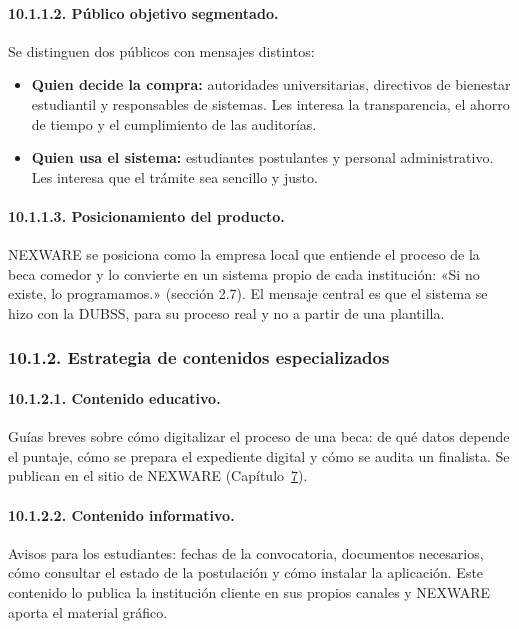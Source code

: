 \paragraph{10.1.1.2. Público objetivo segmentado.}

Se distinguen dos públicos con mensajes distintos:

\begin{itemize}
    \item \textbf{Quien decide la compra:} autoridades universitarias, directivos de bienestar estudiantil y responsables de sistemas. Les interesa la transparencia, el ahorro de tiempo y el cumplimiento de las auditorías.
    \item \textbf{Quien usa el sistema:} estudiantes postulantes y personal administrativo. Les interesa que el trámite sea sencillo y justo.
\end{itemize}

\paragraph{10.1.1.3. Posicionamiento del producto.}

NEXWARE se posiciona como la empresa local que entiende el proceso de la beca comedor y lo convierte en un sistema propio de cada institución: «Si no existe, lo programamos.» (sección 2.7). El mensaje central es que el sistema se hizo con la DUBSS, para su proceso real y no a partir de una plantilla.

\subsubsection{10.1.2. Estrategia de contenidos especializados}

\paragraph{10.1.2.1. Contenido educativo.}

Guías breves sobre cómo digitalizar el proceso de una beca: de qué datos depende el puntaje, cómo se prepara el expediente digital y cómo se audita un finalista. Se publican en el sitio de NEXWARE (Capítulo~\hyperref[cap:sitio_web]{7}).

\paragraph{10.1.2.2. Contenido informativo.}

Avisos para los estudiantes: fechas de la convocatoria, documentos necesarios, cómo consultar el estado de la postulación y cómo instalar la aplicación. Este contenido lo publica la institución cliente en sus propios canales y NEXWARE aporta el material gráfico.

